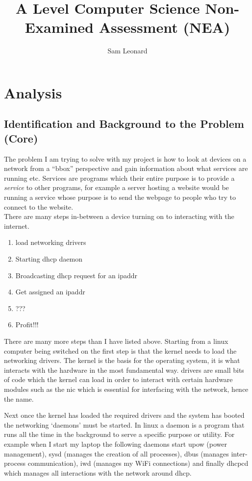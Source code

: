 \documentclass[titlepage]{article}
\author{Sam Leonard}
\title{A Level Computer Science Non-Examined Assessment (NEA)}
\date{} %
\let\Oldsection\section{}
\renewcommand{\section}{\FloatBarrier\Oldsection}
\let\Oldsubsection\subsection{}
\renewcommand{\subsection}{\FloatBarrier\Oldsubsection}
\begin{document}
\maketitle

\tableofcontents

\section{Analysis}

\subsection{Identification and Background to the Problem (Core)}

The problem I am trying to solve with my project is how to look at devices on a network
from a ``\gls{bbox}'' perspective and gain information about what \glspl{service} are running etc.
Services are programs which their entire purpose is to provide a \textit{\gls{service}} to other
programs, for example a server hosting a website would be running a \gls{service} whose purpose
is to send the webpage to people who try to connect to the website. \\
There are many steps in-between a device turning on to interacting with the internet.

\begin{enumerate}
  \item{load networking \glspl{driver}}
  \item{Starting \gls{dhcp} \gls{daemon}}
  \item{Broadcasting \gls{dhcp} request for an \gls{ipaddr}}
  \item{Get assigned an \gls{ipaddr}}
  \item{???}
  \item{Profit!!!}
\end{enumerate}

There are many more steps than I have listed above. Starting from a linux computer being switched on
the first step is that the \gls{kernel} needs to load the networking \glspl{driver}. The \gls{kernel} is the basis for the
operating system, it is what interacts with the hardware in the most fundamental way. \glspl{driver} are small
bits of code which the \gls{kernel} can load in order to interact with certain hardware modules such as the
\gls{nic} which is essential for interfacing with the network, hence the name.

Next once the \gls{kernel} has loaded the required \glspl{driver} and the system has booted the networking
`\glspl{daemon}' must be started. In linux a \gls{daemon} is a program that runs all the time in the background
to serve a specific purpose or utility. For example when I start my laptop the following \glspl{daemon} start
\gls{upow} (power management), \gls{sysd} (manages the creation of all processes), \gls{dbus} (manages
inter-process communication), iwd (manages my WiFi connections) and finally \gls{dhcpcd} which manages all
interactions with the network around \gls{dhcp}.
\end{document}
